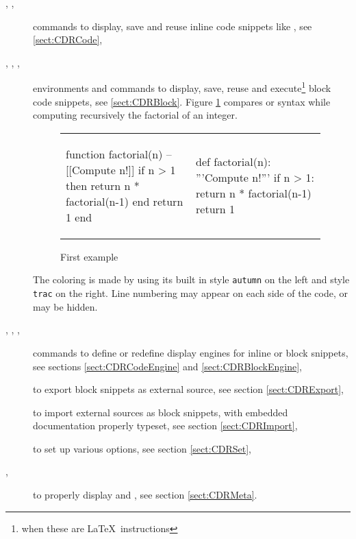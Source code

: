 \documentclass{article}
\begin{document}
\begin{description}
\item[{}, , ]
commands to display, save and reuse inline code snippets
like , see \ref{sect:CDRCode},
\item[, , , ] environments
and commands to display, save, reuse and execute\footnote{when these are \LaTeX\ instructions} block code snippets, see \ref{sect:CDRBlock}.
Figure \ref{fig:First example} compares  or  syntax while computing recursively the factorial of an integer.
\begin{figure}[h!]
\begin{center}
\begin{tabular}{p{0.495\linewidth}|p{0.495\linewidth}}
\begin{minipage}[t]{0.9\linewidth}
\begin{CDRBlock}[tags=lua]
function factorial(n)
  --[[Compute n!]]
  if n > 1 then
    return n * factorial(n-1)
  end
  return 1
end
\end{CDRBlock}
\end{minipage}%
\hspace{0.09\linewidth}
&
\hspace{0.09\linewidth}%
\begin{minipage}[t]{0.8\linewidth}
\begin{CDRBlock}[tags=py]
def factorial(n):
  '''Compute n!'''
  if n > 1:
    return n * factorial(n-1)
  return 1
\end{CDRBlock}
\end{minipage}%
\end{tabular}
\end{center}
\caption{First example}
\label{fig:First example}
\end{figure}
The coloring is made by  using its built in style \texttt{autumn} on the left and style \texttt{trac} on the right. Line numbering may appear on each side of the code, or may be hidden.
\item[{%
,
,
,
%
}]
commands to define or redefine display engines
for inline or block snippets,
see sections \ref{sect:CDRCodeEngine} and \ref{sect:CDRBlockEngine},
\item[]
to export block snippets as external source,
see section \ref{sect:CDRExport},
\item[]
to import external sources as block snippets,
with embedded documentation properly typeset,
see section \ref{sect:CDRImport},
\item[]
to set up various options,
see section \ref{sect:CDRSet},
\item[, ] 
to properly display  and ,
see section \ref{sect:CDRMeta}.
\end{description}
\end{document}
